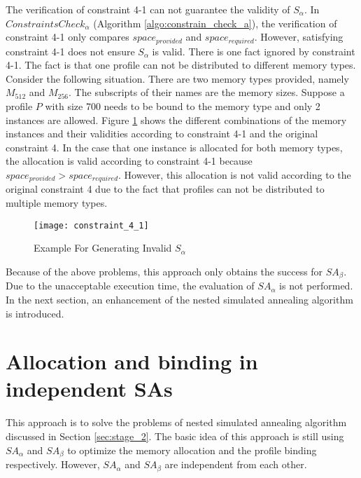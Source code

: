 		The verification of constraint 4-1 can not guarantee the validity of $S_{\alpha}$.
		In $ConstraintsCheck_{\alpha}$ (Algorithm \ref{algo:constrain_check_a}),
		the verification of constraint 4-1 only compares $space_{provided}$ and
		$space_{required}$. However, satisfying constraint 4-1 does not ensure $S_{\alpha}$
		is valid. There is one fact ignored by constraint 4-1. The fact is that one profile
		can not be distributed to different memory types. Consider the following situation.
		There are two memory types provided, namely $M_{512}$ and $M_{256}$. The subscripts
		of their names are the memory sizes. Suppose a profile $P$ with size 700 needs to
		be bound to the memory type and only 2 instances are allowed.
		Figure \ref{fig:cons_4_1_invalid} shows the different combinations of the memory
		instances and their validities according to constraint 4-1 and the original
		constraint 4. In the case that one instance is allocated for both memory types,
		the allocation is valid according to constraint 4-1 because
		$space_{provided} > space_{required}$. However, this allocation is not valid
		according to the original constraint 4 due to the fact that profiles can not
		be distributed to multiple memory types.
		\begin{figure}[htb]
			\begin{center}
				\texttt{[image: constraint\_4\_1]}
				\caption{Example For Generating Invalid $S_{\alpha}$}
				\label{fig:cons_4_1_invalid}
			\end{center}
		\end{figure}
	
		Because of the above problems, this approach only obtains the success for
		$SA_{\beta}$. Due to the unacceptable execution time, the
		evaluation of $SA_{\alpha}$ is not performed.
		In the next section, an enhancement of the nested simulated
		annealing algorithm is introduced.
		
	\section{Allocation and binding in independent SAs}
	\label{sec:stage_3}
	This approach is to solve the problems of nested simulated annealing algorithm
	discussed in Section \ref{sec:stage_2}. The basic idea of this approach is
	still using $SA_{\alpha}$ and $SA_{\beta}$ to optimize the memory allocation
	and the profile binding respectively. However, $SA_{\alpha}$ and $SA_{\beta}$
	are independent from each other.
	
